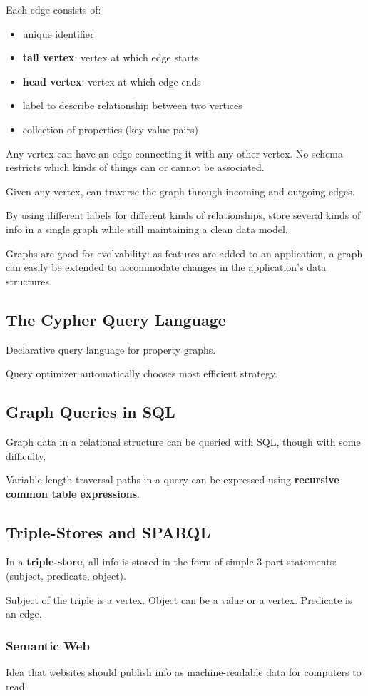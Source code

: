 \documentclass[11pt]{article}
\begin{document}
Each edge consists of:
\begin{itemize}
\item unique identifier
\item \textbf{tail vertex}: vertex at which edge starts
\item \textbf{head vertex}: vertex at which edge ends
\item label to describe relationship between two vertices
\item collection of properties (key-value pairs)
\end{itemize}

Any vertex can have an edge connecting it with any other
vertex. No schema restricts which kinds of things can or cannot
be associated.

Given any vertex, can traverse the graph through incoming and
outgoing edges.

By using different labels for different kinds of relationships,
store several kinds of info in a single graph while still
maintaining a clean data model.

Graphs are good for evolvability: as features are added to an
application, a graph can easily be extended to accommodate
changes in the application's data structures.
\subsection{The Cypher Query Language}
\label{sec:org38f1fc2}
Declarative query language for property graphs.

Query optimizer automatically chooses most efficient strategy.
\subsection{Graph Queries in SQL}
\label{sec:org3e0cb55}
Graph data in a relational structure can be queried with SQL,
though with some difficulty.

Variable-length traversal paths in a query can be expressed
using \textbf{recursive common table expressions}.
\subsection{Triple-Stores and SPARQL}
\label{sec:orge7a13e9}
In a \textbf{triple-store}, all info is stored in the form of simple
3-part statements: (subject, predicate, object).

Subject of the triple is a vertex.
Object can be a value or a vertex.
Predicate is an edge.
\subsubsection{Semantic Web}
\label{sec:orga4d2ab9}
Idea that websites should publish info as machine-readable
data for computers to read.
\end{document}
